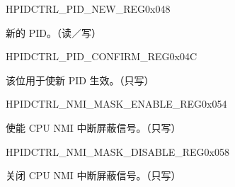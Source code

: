     
    \begin{register}{H}{PIDCTRL\_PID\_NEW\_REG}{0x048}\label{regdesc:PIDCTRLPIDNEWREG}
    \regnewline%
    \begin{regdesc}\begin{reglist}
    \item [PIDCTRL\_PID\_NEW] 新的 PID。（读／写）
    \end{reglist}\end{regdesc}
    \end{register}
    
    
    \begin{register}{H}{PIDCTRL\_PID\_CONFIRM\_REG}{0x04C}\label{regdesc:PIDCTRLPIDCONFIRMREG}
    \regnewline%
    \begin{regdesc}\begin{reglist}
    \item [PIDCTRL\_PID\_CONFIRM]该位用于使新 PID 生效。（只写）
    \end{reglist}\end{regdesc}
    \end{register}
    
    
    \begin{register}{H}{PIDCTRL\_NMI\_MASK\_ENABLE\_REG}{0x054}\label{regdesc:PIDCTRLNMIMASKENABLEREG}
    \regnewline%
    \begin{regdesc}\begin{reglist}
    \item [PIDCTRL\_NMI\_MASK\_ENABLE]使能 CPU NMI 中断屏蔽信号。（只写）
    \end{reglist}\end{regdesc}
    \end{register}
    
    
    \begin{register}{H}{PIDCTRL\_NMI\_MASK\_DISABLE\_REG}{0x058}\label{regdesc:PIDCTRLNMIMASKDISABLEREG}
    \regnewline%
    \begin{regdesc}\begin{reglist}
    \item [PIDCTRL\_NMI\_MASK\_DISABLE]关闭 CPU NMI 中断屏蔽信号。（只写）
    \end{reglist}\end{regdesc}
    \end{register}
    